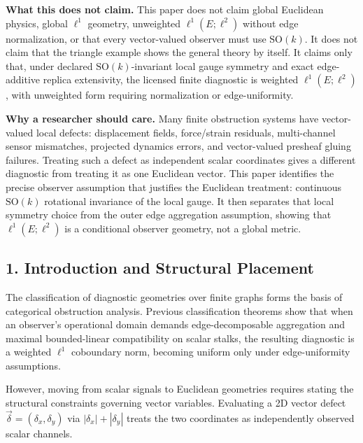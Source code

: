 \documentclass[
  11pt,
]{article}
\renewenvironment{quote}
  {\begin{leftbar}\small}
  {\end{leftbar}}
\begin{document}
\begin{quote}
\textbf{What this does not claim.} This paper does not claim global
Euclidean physics, global \(\ell^1\) geometry, unweighted
\(\ell^1(E;\ell^2)\) without edge normalization, or that every
vector-valued observer must use \(\mathrm{SO}(k)\). It does not claim
that the triangle example shows the general theory by itself. It claims
only that, under declared \(\mathrm{SO}(k)\)-invariant local gauge
symmetry and exact edge-additive replica extensivity, the licensed
finite diagnostic is weighted \(\ell^1(E;\ell^2)\), with unweighted form
requiring normalization or edge-uniformity.

\textbf{Why a researcher should care.} Many finite obstruction systems
have vector-valued local defects: displacement fields, force/strain
residuals, multi-channel sensor mismatches, projected dynamics errors,
and vector-valued presheaf gluing failures. Treating such a defect as
independent scalar coordinates gives a different diagnostic from
treating it as one Euclidean vector. This paper identifies the precise
observer assumption that justifies the Euclidean treatment: continuous
\(\mathrm{SO}(k)\) rotational invariance of the local gauge. It then
separates that local symmetry choice from the outer edge aggregation
assumption, showing that \(\ell^1(E;\ell^2)\) is a conditional observer
geometry, not a global metric.
\end{quote}

\subsection{1. Introduction and Structural
Placement}\label{introduction-and-structural-placement}

The classification of diagnostic geometries over finite graphs forms the
basis of categorical obstruction analysis. Previous classification
theorems show that when an observer's operational domain demands
edge-decomposable aggregation and maximal bounded-linear compatibility
on scalar stalks, the resulting diagnostic is a weighted \(\ell^1\)
coboundary norm, becoming uniform only under edge-uniformity
assumptions.

However, moving from scalar signals to Euclidean geometries requires
stating the structural constraints governing vector variables.
Evaluating a 2D vector defect \(\vec{\delta} = (\delta_x, \delta_y)\)
via \(|\delta_x| + |\delta_y|\) treats the two coordinates as
independently observed scalar channels.
\end{document}
